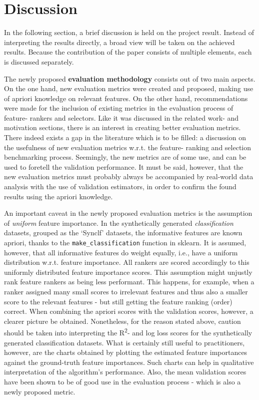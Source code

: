 \documentclass[../main.tex]{subfiles}
\begin{document}
\section{Discussion}\label{section:discussion}
In the following section, a brief discussion is held on the project result. Instead of interpreting the results directly, a broad view will be taken on the achieved results. Because the contribution of the paper consists of multiple elements, each is discussed separately.

The newly proposed \textbf{evaluation methodology} consists out of two main aspects. On the one hand, new evaluation metrics were created and proposed, making use of \gls{apriori} knowledge on relevant features. On the other hand, recommendations were made for the inclusion of existing metrics in the evaluation process of feature- rankers and selectors. Like it was discussed in the related work- and motivation sections, there is an interest in creating better evaluation metrics. There indeed exists a gap in the literature which is to be filled: a discussion on the usefulness of new evaluation metrics w.r.t. the feature- ranking and selection benchmarking process. Seemingly, the new metrics are of some use, and can be used to foretell the validation performance. It must be said, however, that the new evaluation metrics must probably always be accompanied by real-world data analysis with the use of validation estimators, in order to confirm the found results using the \gls{apriori} knowledge.

An important caveat in the newly proposed evaluation metrics is the assumption of \textit{uniform} feature importance. In the synthetically generated \textit{classification} datasets, grouped as the `Synclf' datasets, the informative features are known \gls{apriori}, thanks to the \texttt{make\_classification} function in sklearn. It is assumed, however, that all informative features do weight equally, i.e., have a uniform distribution w.r.t. feature importance. All rankers are scored accordingly to this uniformly distributed feature importance scores. This assumption might unjustly rank feature rankers as being less performant. This happens, for example, when a ranker assigned many small scores to irrelevant features and thus also a smaller score to the relevant features - but still getting the feature ranking (order) correct. When combining the \gls{apriori} scores with the validation scores, however, a clearer picture be obtained. Nonetheless, for the reason stated above, caution should be taken into interpreting the R\textsuperscript{2}- and log loss scores for the synthetically generated classification datasets. What is certainly still useful to practitioners, however, are the charts obtained by plotting the estimated feature importances against the ground-truth feature importances. Such charts can help in qualitative interpretation of the algorithm's performance. Also, the mean validation scores have been shown to be of good use in the evaluation process - which is also a newly proposed metric.
\end{document}
